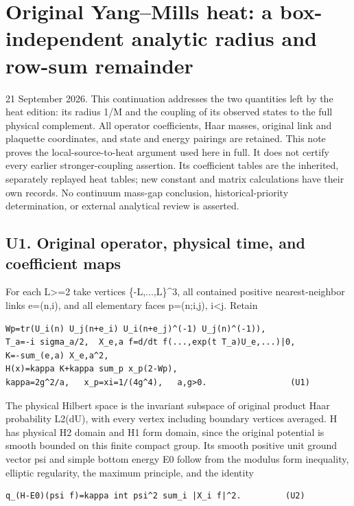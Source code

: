 \documentclass[11pt,a4paper]{article}
\let\originalsection\section
\renewcommand{\section}{\clearpage\originalsection}
\renewcommand{\[}{\begingroup\small\originaldisplaystart}
\renewcommand{\]}{\originaldisplayend\endgroup}
\begin{document}
\section{Original Yang--Mills heat: a box-independent analytic radius
and row-sum
remainder}\label{original-yangmills-heat-a-box-independent-analytic-radius-and-row-sum-remainder}

21 September 2026. This continuation addresses the two quantities left
by the heat edition: its radius 1/M and the coupling of its observed
states to the full physical complement. All operator coefficients, Haar
masses, original link and plaquette coordinates, and state and energy
pairings are retained. This note proves the local-source-to-heat
argument used here in full. It does not certify every earlier
stronger-coupling assertion. Its coefficient tables are the inherited,
separately replayed heat tables; new constant and matrix calculations
have their own records. No continuum mass-gap conclusion,
historical-priority determination, or external analytical review is
asserted.

\subsection{U1. Original operator, physical time, and coefficient
maps}\label{u1.-original-operator-physical-time-and-coefficient-maps}

For each L\textgreater=2 take vertices \{-L,...,L\}\^{}3, all contained
positive nearest-neighbor links e=(n,i), and all elementary faces
p=(n;i,j), i\textless j. Retain

\begin{verbatim}
Wp=tr(U_i(n) U_j(n+e_i) U_i(n+e_j)^(-1) U_j(n)^(-1)),
T_a=-i sigma_a/2,  X_e,a f=d/dt f(...,exp(t T_a)U_e,...)|0,
K=-sum_(e,a) X_e,a^2,
H(x)=kappa K+kappa sum_p x_p(2-Wp),
kappa=2g^2/a,   x_p=xi=1/(4g^4),   a,g>0.                 (U1)
\end{verbatim}

The physical Hilbert space is the invariant subspace of original product
Haar probability L2(dU), with every vertex including boundary vertices
averaged. H has physical H2 domain and H1 form domain, since the
original potential is smooth bounded on this finite compact group. Its
smooth positive unit ground vector psi and simple bottom energy E0
follow from the modulus form inequality, elliptic regularity, the
maximum principle, and the identity

\begin{verbatim}
q_(H-E0)(psi f)=kappa int psi^2 sum_i |X_i f|^2.         (U2)
\end{verbatim}
\end{document}

